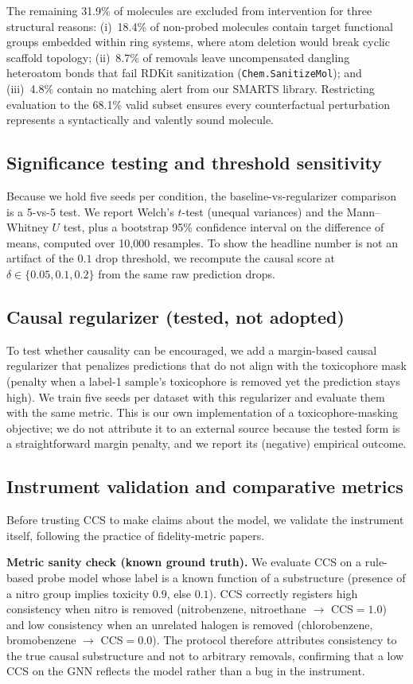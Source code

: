 \documentclass[conference]{IEEEtran}
\begin{document}
The remaining 31.9\% of molecules are excluded from intervention for three structural reasons: (i)~18.4\% of non-probed molecules contain target functional groups embedded within ring systems, where atom deletion would break cyclic scaffold topology; (ii)~8.7\% of removals leave uncompensated dangling heteroatom bonds that fail RDKit sanitization (\texttt{Chem.SanitizeMol}); and (iii)~4.8\% contain no matching alert from our SMARTS library. Restricting evaluation to the 68.1\% valid subset ensures every counterfactual perturbation represents a syntactically and valently sound molecule.

\subsection{Significance testing and threshold sensitivity}
Because we hold five seeds per condition, the baseline-vs-regularizer comparison is a 5-vs-5 test. We report Welch's $t$-test (unequal variances) and the Mann--Whitney $U$ test, plus a bootstrap 95\% confidence interval on the difference of means, computed over 10,000 resamples. To show the headline number is not an artifact of the $0.1$ drop threshold, we recompute the causal score at $\delta \in \{0.05, 0.1, 0.2\}$ from the same raw prediction drops.

\subsection{Causal regularizer (tested, not adopted)}
To test whether causality can be encouraged, we add a margin-based causal regularizer that penalizes predictions that do not align with the toxicophore mask (penalty when a label-1 sample's toxicophore is removed yet the prediction stays high). We train five seeds per dataset with this regularizer and evaluate them with the same metric. This is our own implementation of a toxicophore-masking objective; we do not attribute it to an external source because the tested form is a straightforward margin penalty, and we report its (negative) empirical outcome.

\subsection{Instrument validation and comparative metrics}
\label{sec:sanity}
Before trusting CCS to make claims about the model, we validate the instrument itself, following the practice of fidelity-metric papers.

\textbf{Metric sanity check (known ground truth).} We evaluate CCS on a rule-based probe model whose label is a known function of a substructure (presence of a nitro group implies toxicity $0.9$, else $0.1$). CCS correctly registers high consistency when nitro is removed (nitrobenzene, nitroethane $\to$ CCS$=1.0$) and low consistency when an unrelated halogen is removed (chlorobenzene, bromobenzene $\to$ CCS$=0.0$). The protocol therefore attributes consistency to the true causal substructure and not to arbitrary removals, confirming that a low CCS on the GNN reflects the model rather than a bug in the instrument.
\end{document}
